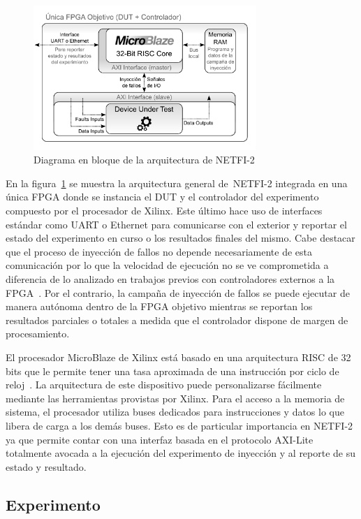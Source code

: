 \documentclass[a4paper,openright,12pt]{report}
\begin{document}
\begin{figure}[H]
	\centering
	\includegraphics[width=0.75\textwidth]{img/netfi2.pdf}
	\caption{Diagrama en bloque de la arquitectura de NETFI-2}
	\label{netfi2}
\end{figure}

En la figura~\ref{netfi2} se muestra la arquitectura general de~\mbox{NETFI-2} integrada en una única FPGA donde se instancia el DUT y el controlador del experimento compuesto por el procesador de Xilinx. Este último hace uso de interfaces estándar como UART o Ethernet para comunicarse con el exterior y reportar el estado del experimento en curso o los resultados finales del mismo. Cabe destacar que el proceso de inyección de fallos no depende necesariamente de esta comunicación por lo que la velocidad de ejecución no se ve comprometida a diferencia de lo analizado en trabajos previos con controladores externos a la FPGA~\cite{Serrano2015}. Por el contrario, la campaña de inyección de fallos se puede ejecutar de manera autónoma dentro de la FPGA objetivo mientras se reportan los resultados parciales o totales a medida que el controlador dispone de margen de procesamiento.

El procesador MicroBlaze de Xilinx está basado en una arquitectura RISC de 32 bits que le permite tener una tasa aproximada de una instrucción por ciclo de reloj~\cite{uBlaze}. La arquitectura de este dispositivo puede personalizarse fácilmente  mediante las herramientas provistas por Xilinx. Para el acceso a la memoria de sistema, el procesador utiliza buses dedicados para instrucciones y datos lo que libera de carga a los demás buses. Esto es de particular importancia en NETFI-2 ya que permite contar con una interfaz basada en el protocolo AXI-Lite ~\cite{AXI} totalmente avocada a la ejecución del experimento de inyección y al reporte de su estado y resultado. 

\subsection{Experimento}
\end{document}
